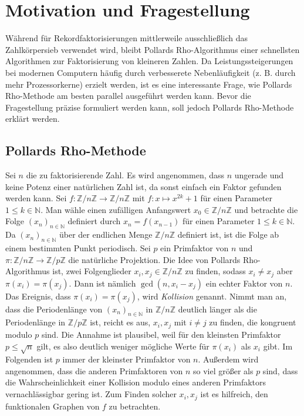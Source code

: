 \documentclass[a4paper, 10pt, ngerman]{article}
\newcommand{\N}{\mathbb{N}}
\newcommand{\Z}{\mathbb{Z}}
\begin{document}
\section{Motivation und Fragestellung}

Während für Rekordfaktorisierungen mittlerweile ausschließlich das Zahlkörpersieb verwendet wird, bleibt Pollards Rho-Algorithmus einer schnellsten Algorithmen zur Faktorisierung von kleineren Zahlen. Da Leistungssteigerungen bei modernen Computern häufig durch verbesserete Nebenläufigkeit (z. B. durch mehr Prozessorkerne) erzielt werden, ist es eine interessante Frage, wie Pollards Rho-Methode am besten parallel ausgeführt werden kann. Bevor die Fragestellung präzise formuliert werden kann, soll jedoch Pollards Rho-Methode erklärt werden.

\subsection{Pollards Rho-Methode}

Sei $n$ die zu faktorisierende Zahl. Es wird angenommen, dass $n$ ungerade und keine Potenz einer natürlichen Zahl ist, da sonst einfach ein Faktor gefunden werden kann. Sei $f : \Z/n\Z \to \Z/n\Z$ mit $f : x \mapsto x^{2k} + 1$ für einen Parameter $1 \le k \in \N$. Man wähle einen zufälligen Anfangswert $x_0 \in \Z/n\Z$ und betrachte die Folge $(x_n)_{n \in \N}$ definiert durch $x_n = f(x_{n - 1})$ für einen Parameter $1 \le k \in \N$. Da $(x_n)_{n \in \N}$ über der endlichen Menge $\Z/n\Z$ definiert ist, ist die Folge ab einem bestimmten Punkt periodisch. Sei $p$ ein Primfaktor von $n$ und $\pi : \Z/n\Z \to \Z/p\Z$ die natürliche Projektion. Die Idee von Pollards Rho-Algorithmus ist, zwei Folgenglieder $x_i, x_j \in \Z/n\Z$ zu finden, sodass $x_i \ne x_j$ aber $\pi(x_i) = \pi(x_j)$. Dann ist nämlich $\gcd(n, x_i - x_j)$ ein echter Faktor von $n$. Das Ereignis, dass $\pi(x_i) = \pi(x_j)$, wird \emph{Kollision} genannt. Nimmt man an, dass die Periodenlänge von $(x_n)_{n \in \N}$ in $\Z/n\Z$ deutlich länger als die Periodenlänge in $\Z/p\Z$ ist, reicht es aus, $x_i, x_j$ mit $i \ne j$ zu finden, die kongruent modulo $p$ sind. Die Annahme ist plausibel, weil für den kleinsten Primfaktor $p \le \sqrt n$ gilt, es also deutlich weniger mögliche Werte für $\pi(x_i)$ als $x_i$ gibt. Im Folgenden ist $p$ immer der kleinster Primfaktor von $n$. Außerdem wird angenommen, dass die anderen Primfaktoren von $n$ so viel größer als $p$ sind, dass die Wahrscheinlichkeit einer Kollision modulo eines anderen Primfaktors vernachlässigbar gering ist. Zum Finden solcher $x_i, x_j$ ist es hilfreich, den funktionalen Graphen von $f$ zu betrachten.
\end{document}
